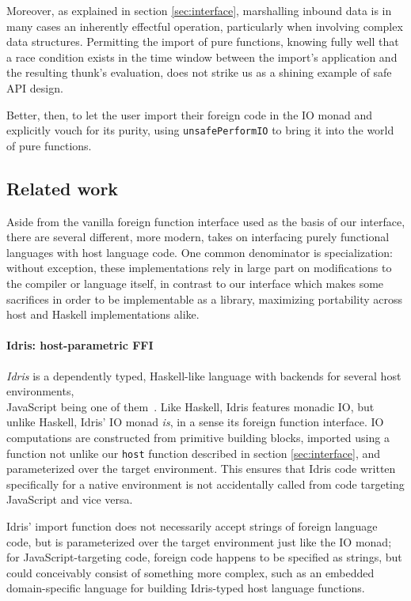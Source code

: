 \documentclass{sigplanconf}
\begin{document}
Moreover, as explained in section \ref{sec:interface}, marshalling inbound
data is in many cases an inherently effectful operation, particularly when
involving complex data structures. Permitting the import of pure functions,
knowing fully well that a race condition exists in the time window between
the import's application and the resulting thunk's evaluation, does not strike
us as a shining example of safe API design.

Better, then, to let the user import their foreign code in the IO monad and
explicitly vouch for its purity, using \lstinline!unsafePerformIO! to bring it
into the world of pure functions.

\subsection{Related work}\label{sec:related}
Aside from the vanilla foreign function interface used as the basis of our
interface, there are several different, more modern, takes on interfacing
purely functional languages with host language code.
One common denominator is specialization: without exception, these
implementations rely in large part on modifications to the compiler or
language itself, in contrast to our interface which makes some sacrifices
in order to be implementable as a library, maximizing portability across
host and Haskell implementations alike.

\paragraph{Idris: host-parametric FFI}
\emph{Idris} is a dependently typed, Haskell-like language with backends for
several host environments,\\
JavaScript being one of them\ \cite{idris}.
Like Haskell, Idris features
\linebreak
monadic IO, but unlike Haskell, Idris' IO monad
\emph{is}, in a sense its foreign function interface.
IO computations are constructed from primitive building blocks, imported using
a function not unlike our \lstinline!host! function described in section
\ref{sec:interface}, and parameterized over the target environment.
This ensures that Idris code written specifically for a native environment
is not accidentally called from code targeting JavaScript and vice versa.

Idris' import function does not necessarily accept strings of foreign
language code, but is parameterized over the target environment just like the
IO monad; for JavaScript-targeting code, foreign code happens to be specified
as strings, but could conceivably consist of something more complex, such as
an embedded domain-specific language for building Idris-typed host language
functions.
\end{document}
